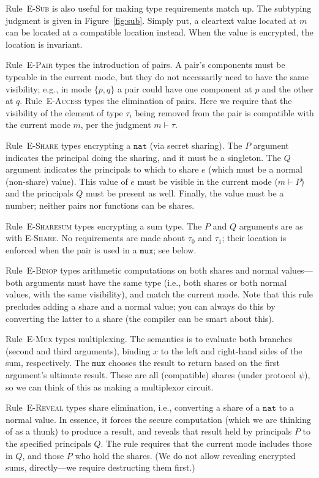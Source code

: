 \documentclass[10pt]{article}
\newcommand{\rulelab}[1]{{\small \textsc{#1}}}
\newcommand{\kw}[1]{\ensuremath{\mathtt{#1}}}
\newcommand{\tnat}{\ensuremath{\mathtt{nat}}}
\begin{document}
Rule~\rulelab{E-Sub} is also useful for making type requirements match
up. The subtyping judgment is given in Figure~\ref{fig:sub}. Simply
put, a cleartext value located at $m$ can be located at a compatible
location instead. When the value is encrypted, the location is
invariant. 

Rule~\rulelab{E-Pair} types the introduction of pairs. A pair's
components must be typeable in the current mode, but they do not
necessarily need to have the same visibility; e.g., in mode $\{p,q\}$
a pair could have one component at $p$ and the other at
$q$. Rule~\rulelab{E-Access} types the elimination of pairs. Here we
require that the visibility of the element of type $\tau_i$ being
removed from the pair is compatible with the current mode $m$, per the
judgment $m \vdash \tau$.

Rule~\rulelab{E-Share} types encrypting a $\tnat$ (via secret
sharing). The $P$ argument indicates the principal doing the sharing,
and it must be a singleton. The $Q$ argument indicates the principals
to which to share $e$ (which must be a normal (non-share) value). This
value of $e$ must be visible in the current mode ($m \vdash P$) and
the principals $Q$ must be present as well. Finally, the value must be
a number; neither pairs nor functions can be shares.

Rule~\rulelab{E-Sharesum} types encrypting a sum type. The $P$ and $Q$
arguments are as with \rulelab{E-Share}. No requirements are made
about $\tau_0$ and $\tau_1$; their location is enforced when the pair
is used in a $\kw{mux}$; see below.

Rule~\rulelab{E-Binop} types arithmetic computations on both shares
and normal values---both arguments must have the same type (i.e., both
shares or both normal values, with the same visibility), and match the
current mode. Note that this rule precludes adding a 
share and a normal value; you can always do this by converting the
latter to a share (the compiler can be smart about this).

Rule~\rulelab{E-Mux} types multiplexing. The semantics is to evaluate
both branches (second and third arguments), binding $x$ to the left
and right-hand sides of the sum, respectively. The $\kw{mux}$ chooses
the result to return based on the first argument's ultimate
result. These are all (compatible) shares (under protocol $\psi$), so
we can think of this as making a multiplexor circuit.

Rule~\rulelab{E-Reveal} types share elimination, i.e., converting a
share of a $\tnat$ to a normal value. In essence, it forces the secure
computation (which we are thinking of as a thunk) to produce a result,
and reveals that result held by principals $P$ to the specified
principals $Q$. The rule requires that the current mode includes those
in $Q$, and those $P$ who hold the shares. (We do not allow revealing
encrypted sums, directly---we require destructing them first.)
\end{document}
